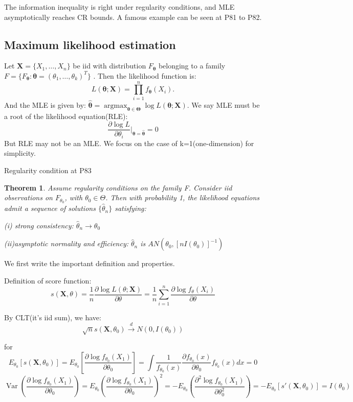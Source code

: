 \documentclass{ctexart}
\newtheorem{theorem}{Theorem}[subsection]
\begin{document}
The information inequality is right under regularity conditions, and MLE asymptotically reaches CR bounds. A famous example can be seen at P81 to P82. 
\subsection{Maximum likelihood estimation}
Let \(\boldsymbol{X}=\{X_{1},\ldots,X_{n}\}\) be iid with distribution \(F_{\boldsymbol{\theta}}\) belonging to a family \(F=\{F_{\boldsymbol{\theta}}:\boldsymbol{\theta}=(\theta_{1},\ldots,\theta_{k})^{T}\}\) 
. Then the likelihood function is: 
\[
L(\boldsymbol{\theta};\boldsymbol{X})=\prod_{i=1}^{n}f_{\boldsymbol{\theta}}(X_{i}).
\] 
And the MLE is given by: \(\hat{\boldsymbol{\theta}}=\operatorname{argmax}_{\boldsymbol{\theta}\in \boldsymbol{\Theta}}\log L(\boldsymbol{\theta};\boldsymbol{X})\). We say MLE must be a root of the likelihood equation(RLE): 
\[
\frac{\partial \log L}{\partial \theta_{i}} \Big|_{\boldsymbol{\theta}=\hat{\boldsymbol{\theta}}}=0
\] 
But RLE may not be an MLE. We focus on the case of k=1(one-dimension) for simplicity. 

Regularity condition at P83

\begin{theorem}
  Assume regularity conditions on the family F. Consider iid observations on \(F_{\theta_{0}}\), with \(\theta_{0}\in \Theta\). Then with probability 1, the likelihood equations admit a sequence of solutions \(\{\hat{\theta}_{n}\}\) satisfying: 
  
  (i) strong consistency: \(\hat{\theta}_{n}\to \theta_{0}\) 

  (ii)asymptotic normality and efficiency: \(\hat{\theta}_{n}\) is \(AN(\theta_{0},[nI(\theta_{0})]^{-1})\) 
\end{theorem}
We first write the important definition and properties. 

Definition of score function: 
\[
s(\boldsymbol{X},\theta)=\frac{1}{n}\frac{\partial \log L(\theta;\boldsymbol{X})}{\partial \theta} =\frac{1}{n}\sum_{i=1}^{n} \frac{\partial \log f_{\theta}(X_{i})}{\partial \theta} 
\] 

By CLT(it's iid sum), we have: 
\[
\sqrt{n}s(\boldsymbol{X},\theta_{0})\xrightarrow{d}N(0,I(\theta_{0}))
\] 

for \[E_{\theta_{0}}[s(\boldsymbol{X},\theta_{0})]=E_{\theta_{0}}[\frac{\partial \log f_{\theta_{0}}(X_{1})}{\partial \theta_{0}} ]=\int \frac{1}{f_{\theta_{0}}(x)}\frac{\partial f_{\theta_{0}}(x)}{\partial \theta_{0}} f_{\theta_{0}}(x)dx=0\]
\[\operatorname{Var}(\frac{\partial \log f_{\theta_{0}}(X_{1})}{\partial \theta_{0}} )=E_{\theta_{0}}(\frac{\partial \log f_{\theta_{0}}(X_{1})}{\partial \theta_{0}} )^{2}=-E_{\theta_{0}}(\frac{\partial^{2} \log f_{\theta_{0}}(X_{1})}{\partial \theta_{0}^{2}} )=-E_{\theta_{0}}[s'(\boldsymbol{X},\theta_{0})]=I(\theta_{0})\]  
\end{document}
